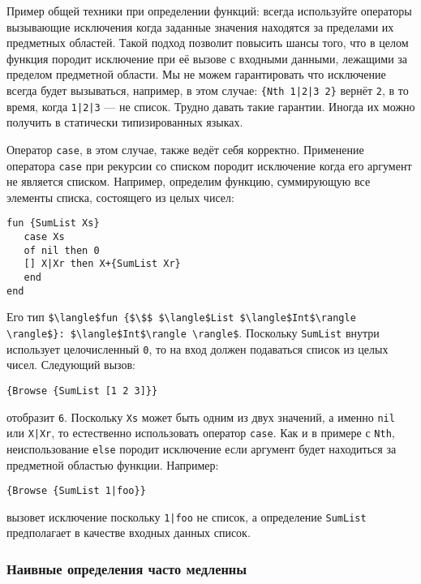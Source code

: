 Пример общей техники при определении функций: всегда используйте операторы вызывающие исключения когда заданные значения находятся за пределами их предметных областей. Такой подход позволит повысить шансы того, что в целом функция породит исключение при её вызове с входными данными, лежащими за пределом предметной области. Мы не можем гарантировать что исключение всегда будет вызываться, например, в этом случае: \lstinline!{Nth 1|2|3 2}! вернёт \lstinline!2!, в то время, когда \lstinline!1|2|3! --- не список. Трудно давать такие гарантии. Иногда их можно получить в статически типизированных языках.

Оператор \lstinline!case!, в этом случае, также ведёт себя корректно. Применение оператора \lstinline!case! при рекурсии со списком породит исключение когда его аргумент не является списком. Например, определим функцию, суммирующую все элементы списка, состоящего из целых чисел:

\begin{lstlisting}
fun {SumList Xs}
   case Xs
   of nil then 0
   [] X|Xr then X+{SumList Xr}
   end
end
\end{lstlisting}

Его тип \lstinline!$\langle$fun {$\$$ $\langle$List $\langle$Int$\rangle \rangle$}: $\langle$Int$\rangle \rangle$!. Поскольку \lstinline!SumList! внутри использует целочисленный \lstinline!0!, то на вход должен подаваться список из целых чисел. Следующий вызов:

\begin{lstlisting}
{Browse {SumList [1 2 3]}}
\end{lstlisting}

отобразит \lstinline!6!. Поскольку \lstinline!Xs! может быть одним из двух значений, а именно \lstinline!nil! или \lstinline!X|Xr!, то естественно использовать оператор \lstinline!case!. Как и в примере с \lstinline!Nth!, неиспользование \lstinline!else! породит исключение если аргумент будет находиться за предметной областью функции. Например:

\begin{lstlisting}
{Browse {SumList 1|foo}}
\end{lstlisting}

вызовет исключение поскольку \lstinline!1|foo! не список, а определение \lstinline!SumList! предполагает в качестве входных данных список.

\subsubsection{Наивные определения часто медленны}

